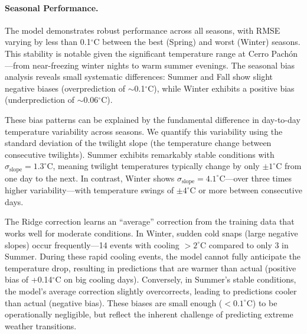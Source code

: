 \documentclass[11pt]{article}
\begin{document}
\paragraph{Seasonal Performance.}
The model demonstrates robust performance across all seasons, with RMSE varying by less than 0.1$^\circ$C between the best (Spring) and worst (Winter) seasons. This stability is notable given the significant temperature range at Cerro Pach\'on---from near-freezing winter nights to warm summer evenings. The seasonal bias analysis reveals small systematic differences: Summer and Fall show slight negative biases (overprediction of $\sim$0.1$^\circ$C), while Winter exhibits a positive bias (underprediction of $\sim$0.06$^\circ$C).

These bias patterns can be explained by the fundamental difference in day-to-day temperature variability across seasons. We quantify this variability using the standard deviation of the twilight slope (the temperature change between consecutive twilights). Summer exhibits remarkably stable conditions with $\sigma_{\text{slope}} = 1.3^\circ$C, meaning twilight temperatures typically change by only $\pm 1^\circ$C from one day to the next. In contrast, Winter shows $\sigma_{\text{slope}} = 4.1^\circ$C---over three times higher variability---with temperature swings of $\pm 4^\circ$C or more between consecutive days.

The Ridge correction learns an ``average'' correction from the training data that works well for moderate conditions. In Winter, sudden cold snaps (large negative slopes) occur frequently---14 events with cooling $>2^\circ$C compared to only 3 in Summer. During these rapid cooling events, the model cannot fully anticipate the temperature drop, resulting in predictions that are warmer than actual (positive bias of +0.14$^\circ$C on big cooling days). Conversely, in Summer's stable conditions, the model's average correction slightly overcorrects, leading to predictions cooler than actual (negative bias). These biases are small enough ($<0.1^\circ$C) to be operationally negligible, but reflect the inherent challenge of predicting extreme weather transitions.
\end{document}
